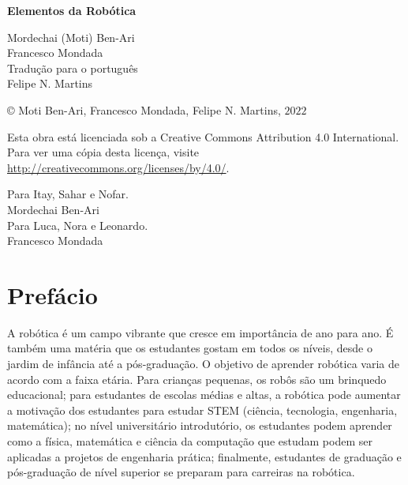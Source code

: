 
\begin{center}
\mbox{}

\vspace{6ex}

\textsf{\bfseries\huge Elementos da Robótica}

\vspace{16ex}

\textsf{\large Mordechai (Moti) Ben-Ari\\[4pt]Francesco Mondada\\[20pt]
Tradução para o português \\[4pt]
Felipe N. Martins}

\end{center}

\vfill

\begin{center}
\copyright{} Moti Ben-Ari, Francesco Mondada, Felipe N. Martins, $2022$
 \end{center}
 
\begin{small}
Esta obra está licenciada sob a Creative Commons Attribution 4.0 International. Para ver uma cópia desta licença, visite \url{http://creativecommons.org/licenses/by/4.0/}.
\end{small}


\newpage
\mbox{}
\vfill
\begin{flushright}
Para Itay, Sahar e Nofar.\\[4pt]
Mordechai Ben-Ari\\[18pt]

Para Luca, Nora e Leonardo.\\[4pt]
Francesco Mondada
\end{flushright}
\vfill
\mbox{}
\newpage

\chapter*{Prefácio}

A robótica é um campo vibrante que cresce em importância de ano para ano. É também uma matéria que os estudantes gostam em todos os níveis, desde o jardim de infância até a pós-graduação. O objetivo de aprender robótica varia de acordo com a faixa etária. Para crianças pequenas, os robôs são um brinquedo educacional; para estudantes de escolas médias e altas, a robótica pode aumentar a motivação dos estudantes para estudar STEM (ciência, tecnologia, engenharia, matemática); no nível universitário introdutório, os estudantes podem aprender como a física, matemática e ciência da computação que estudam podem ser aplicadas a projetos de engenharia prática; finalmente, estudantes de graduação e pós-graduação de nível superior se preparam para carreiras na robótica.

